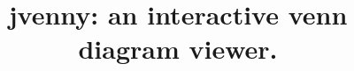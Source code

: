 \documentclass{bmcart}
\begin{document}
\begin{frontmatter}

\begin{fmbox}


\title{jvenny: an interactive venn diagram viewer.}


\author[
   addressref={aff1},                   %
   corref={aff1},                       %
   noteref={n1},                        %
   email={jane.e.doe@cambridge.co.uk}   %
]{ }
\author[
   addressref={aff1,aff2},
   email={john.RS.Smith@cambridge.co.uk}
]{ }


\address[id=aff1]{%
  , %
  ,                     %
  ,                              %
}
\address[id=aff2]{%
  ,
  ,
  ,
}


\end{fmbox}
\end{frontmatter}
\end{document}
